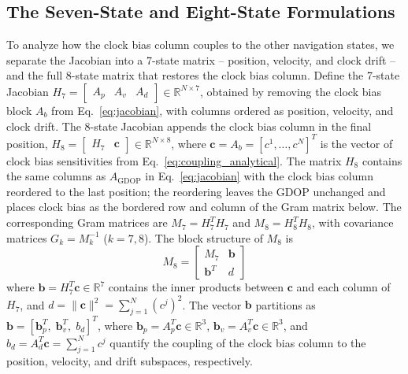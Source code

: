 \documentclass[letterpaper,times]{IONconf-v2}
\theoremstyle{plain}
\theoremstyle{remark}
\begin{document}
\vspace{-10pt}

\subsection{The Seven-State and Eight-State Formulations}\label{subsec:formulations}

To analyze how the clock bias column couples to the other navigation states, we separate the Jacobian into a 7-state matrix -- position, velocity, and clock drift -- and the full 8-state matrix that restores the clock bias column. Define the 7-state Jacobian $H_7 = \begin{bmatrix} A_p & A_v & A_d \end{bmatrix} \in \mathbb{R}^{N \times 7}$, obtained by removing the clock bias block $A_b$ from Eq.~\eqref{eq:jacobian}, with columns ordered as position, velocity, and clock drift. The 8-state Jacobian appends the clock bias column in the final position, $H_8 = \begin{bmatrix} H_7 & \mathbf{c} \end{bmatrix} \in \mathbb{R}^{N \times 8}$, where $\mathbf{c} = A_b = [c^1, \ldots, c^N]^T$ is the vector of clock bias sensitivities from Eq.~\eqref{eq:coupling_analytical}. The matrix $H_8$ contains the same columns as $A_{\mathrm{GDOP}}$ in Eq.~\eqref{eq:jacobian} with the clock bias column reordered to the last position; the reordering leaves the GDOP unchanged and places clock bias as the bordered row and column of the Gram matrix below. The corresponding Gram matrices are $M_7 = H_7^T H_7$ and $M_8 = H_8^T H_8$, with covariance matrices $G_k = M_k^{-1}$ ($k = 7, 8$). The block structure of $M_8$ is
\begin{equation}\label{eq:M8_block}
M_8 = \begin{bmatrix} M_7 & \mathbf{b} \\ \mathbf{b}^T & d \end{bmatrix}
\end{equation}
where $\mathbf{b} = H_7^T \mathbf{c} \in \mathbb{R}^7$ contains the inner products between $\mathbf{c}$ and each column of $H_7$, and $d = \|\mathbf{c}\|^2 = \sum_{j=1}^N (c^j)^2$. The vector $\mathbf{b}$ partitions as $\mathbf{b} = [\mathbf{b}_p^T,\; \mathbf{b}_v^T,\; b_d]^T$, where $\mathbf{b}_p = A_p^T \mathbf{c} \in \mathbb{R}^3$, $\mathbf{b}_v = A_v^T \mathbf{c} \in \mathbb{R}^3$, and $b_d = A_d^T \mathbf{c} = \sum_{j=1}^N c^j$ quantify the coupling of the clock bias column to the position, velocity, and drift subspaces, respectively.
\end{document}
